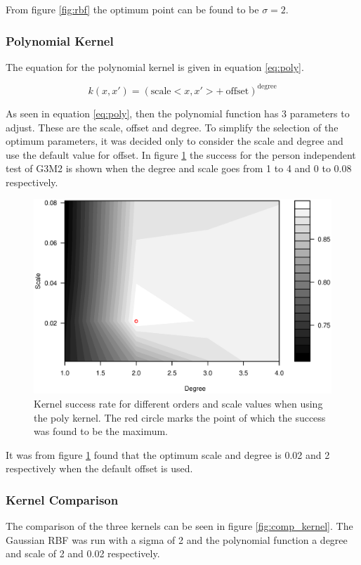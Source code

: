 From figure \ref{fig:rbf} the optimum point can be found to be $\sigma = 2$.

\subsubsection{Polynomial Kernel}
The equation for the polynomial kernel is given in equation \ref{eq:poly}.

\begin{equation}
k(x,x') = (\text{scale} <x, x'> +\ \text{offset})^{\text{degree}}
\label{eq:poly}
\end{equation}

As seen in equation \ref{eq:poly}, then the polynomial function has 3 parameters to adjust.
These are the scale, offset and degree.
To simplify the selection of the optimum parameters, it was decided only to consider the scale and degree and use the default value for offset.
In figure \ref{fig:poly} the success for the person independent test of G3M2 is shown when the degree and scale goes from 1 to 4 and 0 to 0.08 respectively.

\begin{figure}[H]
\centering
\includegraphics[width = 0.9 \textwidth]{graphics/contour_svm_poly}
\caption{Kernel success rate for different orders and scale values when using the poly kernel.
The red circle marks the point of which the success was found to be the maximum.}
\label{fig:poly}
\end{figure}

It was from figure \ref{fig:poly} found that the optimum scale and degree is 0.02 and 2 respectively when the default offset is used.


\subsubsection{Kernel Comparison}
The comparison of the three kernels can be seen in figure \ref{fig:comp_kernel}.
The Gaussian RBF was run with a sigma of 2 and the polynomial function a degree and scale of 2 and 0.02 respectively.


